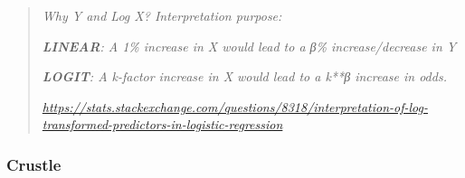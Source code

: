 \documentclass[
]{article}
\newenvironment{Shaded}{\begin{snugshade}}{\end{snugshade}}
\newcommand{\AttributeTok}[1]{\textcolor[rgb]{0.77,0.63,0.00}{#1}}
\newcommand{\DecValTok}[1]{\textcolor[rgb]{0.00,0.00,0.81}{#1}}
\newcommand{\FunctionTok}[1]{\textcolor[rgb]{0.00,0.00,0.00}{#1}}
\newcommand{\NormalTok}[1]{#1}
\newcommand{\OtherTok}[1]{\textcolor[rgb]{0.56,0.35,0.01}{#1}}
\newcommand{\SpecialCharTok}[1]{\textcolor[rgb]{0.00,0.00,0.00}{#1}}
\newcommand{\StringTok}[1]{\textcolor[rgb]{0.31,0.60,0.02}{#1}}
\begin{document}
\begin{quote}
\emph{Why Y and Log X? Interpretation purpose:}

\emph{\textbf{LINEAR}: A 1\% increase in X would lead to a β\%
increase/decrease in Y}

\emph{\textbf{LOGIT}: A k-factor increase in X would lead to a k**β
increase in odds.}

\href{https://stats.stackexchange.com/questions/8318/interpretation-of-log-transformed-predictors-in-logistic-regression}{\emph{https://stats.stackexchange.com/questions/8318/interpretation-of-log-transformed-predictors-in-logistic-regression}}
\end{quote}

\hypertarget{crustle}{%
\subsubsection{Crustle}\label{crustle}}

\begin{Shaded}
\end{Shaded}
\end{document}
